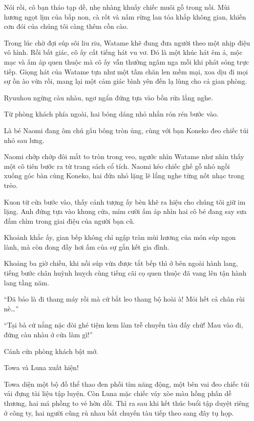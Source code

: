 \documentclass[../main.tex]{subfiles}
\begin{document}
Nói rồi, cô bạn tháo tạp dề, nhẹ nhàng khuấy chiếc muôi gỗ trong nồi. Mùi hương ngọt lịm của bắp non, cà rốt và nấm rừng lan tỏa khắp không gian, khiến cơn đói của chúng tôi càng thêm cồn cào.

Trong lúc chờ đợi súp sôi liu riu, Watame khẽ đung đưa người theo một nhịp điệu vô hình. Rồi bất giác, cô ấy cất tiếng hát vu vơ. Đó là một khúc hát êm ả, mộc mạc và ấm áp quen thuộc mà cô ấy vẫn thường ngâm nga mỗi khi phát sóng trực tiếp. Giọng hát của Watame tựa như một tấm chăn len mềm mại, xoa dịu đi mọi sự ồn ào vừa rồi, mang lại một cảm giác bình yên đến lạ lùng cho cả gian phòng.

Ryuuhou ngừng càu nhàu, ngơ ngẩn đứng tựa vào bồn rửa lắng nghe.

Từ phòng khách phía ngoài, hai bóng dáng nhỏ nhắn rón rén bước vào.

Là bé Naomi đang ôm chú gấu bông tròn ủng, cùng với bạn Koneko đeo chiếc túi nhỏ sau lưng.

Naomi chớp chớp đôi mắt to tròn trong veo, ngước nhìn Watame như nhìn thấy một cô tiên bước ra từ trang sách cổ tích. Naomi kéo chiếc ghế gỗ nhỏ ngồi xuống góc bàn cùng Koneko, hai đứa nhỏ lặng lẽ lắng nghe từng nốt nhạc trong trẻo.

Kuon từ cửa bước vào, thấy cảnh tượng ấy bèn khẽ ra hiệu cho chúng tôi giữ im lặng. Anh đứng tựa vào khung cửa, mỉm cười ấm áp nhìn hai cô bé đang say sưa đắm chìm trong giai điệu của người bạn cũ.

Khoảnh khắc ấy, gian bếp không chỉ ngập tràn mùi hương của món súp ngon lành, mà còn đong đầy hơi ấm của sự gắn kết gia đình.

\ct

Khoảng ba giờ chiều, khi nồi súp vừa được tắt bếp thì ở bên ngoài hành lang, tiếng bước chân huỳnh huỵch cùng tiếng cãi cọ quen thuộc đã vang lên tận hành lang tầng năm.

``Đã bảo là đi thang máy rồi mà cứ bắt leo thang bộ hoài à! Mỏi hết cả chân rùi nè\dots''

``Tại bà cứ nằng nặc đòi ghé tiệm kem làm trễ chuyến tàu đấy chứ! Mau vào đi, đứng càu nhàu ở cửa làm gì!''

Cánh cửa phòng khách bật mở.

Towa và Luna xuất hiện!

Towa diện một bộ đồ thể thao đen phối tím năng động, một bên vai đeo chiếc túi vải đựng tài liệu tập luyện. Còn Luna mặc chiếc váy xòe màu hồng phấn dễ thương, hai má phồng to vẻ hờn dỗi. Thì ra sau khi kết thúc buổi tập duyệt riêng ở công ty, hai người cũng rủ nhau bắt chuyến tàu tiếp theo sang đây tụ họp.
\end{document}
